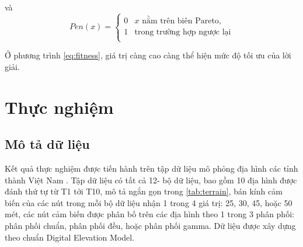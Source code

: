 \documentclass{hust}
\begin{document}
và
\begin{equation}
Pen(x) = \begin{cases}
0 & \text{$x$ nằm trên biên Pareto,}\\
1 & \text{trong trường hợp ngược lại}\\
\end{cases}
\end{equation}

Ở phương trình \ref{eq:fitness}, giá trị càng cao càng thể hiện mức độ tối ưu của lời giải.


\section{Thực nghiệm}
\subsection{Mô tả dữ liệu}
Kết quả thực nghiệm được tiến hành trên tập dữ liệu mô phỏng địa hình các tỉnh thành Việt Nam \cite{tam2018improving}. Tập dữ liệu có tất cả 12- bộ dữ liệu, bao gồm 10 địa hình được đánh thứ tự từ T1 tới T10, mô tả ngắn gọn trong \ref{tab:terrain}, bán kính cảm biến của các nút trong mỗi bộ dữ liệu nhận 1 trong 4 giá trị: 25, 30, 45, hoặc 50 mét, các nút cảm biến được phân bố trên các địa hình theo 1 trong 3 phân phối: phân phối chuẩn, phân phối đều, hoặc phân phối gamma. Dữ liệu được xây dựng theo chuẩn Digital Elevation Model.
\end{document}
